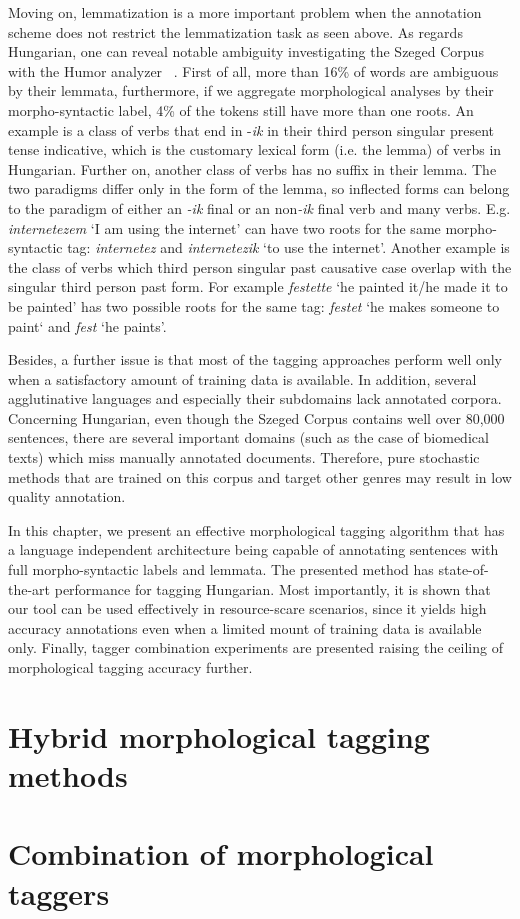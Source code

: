 Moving on, lemmatization is a more important problem when the annotation scheme does not restrict the lemmatization task as seen above. \label{par:lemma-ambiguity}
As regards Hungarian, one can reveal notable ambiguity investigating the Szeged Corpus~\cite{Csendes2004} with the Humor analyzer ~\cite{Proszeky1994,Novak2003,Proszeky2005}. 
First of all, more than 16\% of words are ambiguous by their lemmata, furthermore, if we aggregate morphological analyses by their morpho-syntactic label, 4\% of the tokens still have more than one roots. 
An example is a class of verbs that end in -\emph{ik} in their third person singular present tense indicative, which is the customary lexical form (i.e. the lemma) of verbs in Hungarian. Further on, another class of verbs has no suffix in their lemma. 
The two paradigms differ only in the form of the lemma, so inflected forms can belong to the paradigm of either an \emph{-ik} final or an non\emph{-ik} final verb and many verbs. 
E.g. \emph{internetezem} `I am using the internet' can have two roots for the same morpho-syntactic tag: \emph{internetez} and \emph{internetezik} `to use the internet'.
Another example is the class of verbs which third person singular past causative case overlap with the singular third person past form. 
For example \emph{festette} `he painted it/he made it to be painted' has two possible roots for the same tag: \emph{festet} `he makes someone to paint` and \emph{fest} `he paints'. 

Besides, a further issue is that most of the tagging approaches perform well only when a satisfactory amount of training data is available. 
In addition, several agglutinative languages and especially their subdomains lack annotated corpora. 
Concerning Hungarian, even though the Szeged Corpus contains well over 80,000 sentences, there are several important domains (such as the case of biomedical texts) which miss manually annotated documents. 
Therefore, pure stochastic methods that are trained on this corpus and target other genres may result in low quality annotation. 

In this chapter, we present an effective morphological tagging algorithm that has a language independent architecture being capable of annotating sentences with full morpho-syntactic labels and lemmata. 
The presented method has state-of-the-art performance for tagging Hungarian.
Most importantly, it is shown that our tool can be used effectively in resource-scare scenarios, since it yields high accuracy annotations even when a limited mount of training data is available only. 
Finally, tagger combination experiments are presented raising the ceiling of morphological tagging accuracy further. 

\section{Hybrid morphological tagging methods}\label{sec:tagging}



\section{Combination of morphological taggers}\label{sec:combination}


 
